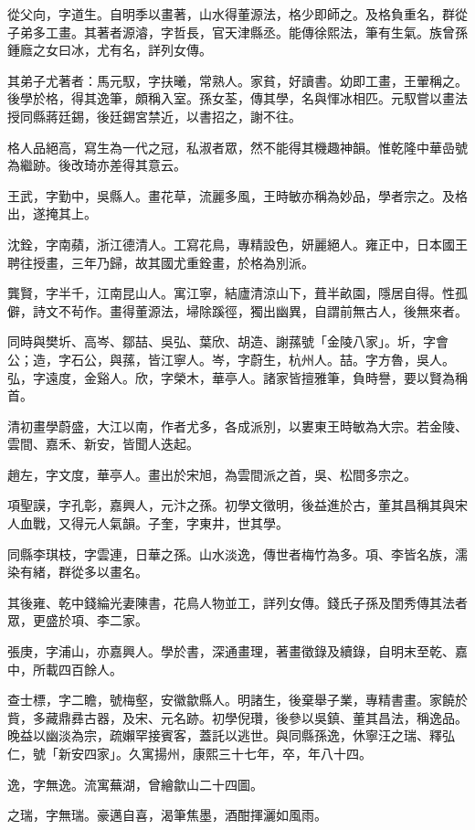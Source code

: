 \begin{pinyinscope}
從父向，字道生。自明季以畫著，山水得董源法，格少即師之。及格負重名，群從子弟多工畫。其著者源濬，字哲長，官天津縣丞。能傳徐熙法，筆有生氣。族曾孫鍾廕之女曰冰，尤有名，詳列女傳。

其弟子尤著者：馬元馭，字扶曦，常熟人。家貧，好讀書。幼即工畫，王翬稱之。後學於格，得其逸筆，頗稱入室。孫女荃，傳其學，名與惲冰相匹。元馭嘗以畫法授同縣蔣廷錫，後廷錫宮禁近，以書招之，謝不往。

格人品絕高，寫生為一代之冠，私淑者眾，然不能得其機趣神韻。惟乾隆中華嵒號為繼跡。後改琦亦差得其意云。

王武，字勤中，吳縣人。畫花草，流麗多風，王時敏亦稱為妙品，學者宗之。及格出，遂掩其上。

沈銓，字南蘋，浙江德清人。工寫花鳥，專精設色，妍麗絕人。雍正中，日本國王聘往授畫，三年乃歸，故其國尤重銓畫，於格為別派。

龔賢，字半千，江南昆山人。寓江寧，結廬清涼山下，葺半畝園，隱居自得。性孤僻，詩文不茍作。畫得董源法，埽除蹊徑，獨出幽異，自謂前無古人，後無來者。

同時與樊圻、高岑、鄒喆、吳弘、葉欣、胡造、謝蓀號「金陵八家」。圻，字會公；造，字石公，與蓀，皆江寧人。岑，字蔚生，杭州人。喆。字方魯，吳人。弘，字遠度，金谿人。欣，字榮木，華亭人。諸家皆擅雅筆，負時譽，要以賢為稱首。

清初畫學蔚盛，大江以南，作者尤多，各成派別，以婁東王時敏為大宗。若金陵、雲間、嘉禾、新安，皆聞人迭起。

趙左，字文度，華亭人。畫出於宋旭，為雲間派之首，吳、松間多宗之。

項聖謨，字孔彰，嘉興人，元汴之孫。初學文徵明，後益進於古，董其昌稱其與宋人血戰，又得元人氣韻。子奎，字東井，世其學。

同縣李琪枝，字雲連，日華之孫。山水淡逸，傳世者梅竹為多。項、李皆名族，濡染有緒，群從多以畫名。

其後雍、乾中錢綸光妻陳書，花鳥人物並工，詳列女傳。錢氏子孫及閨秀傳其法者眾，更盛於項、李二家。

張庚，字浦山，亦嘉興人。學於書，深通畫理，著畫徵錄及續錄，自明末至乾、嘉中，所載四百餘人。

查士標，字二瞻，號梅壑，安徽歙縣人。明諸生，後棄舉子業，專精書畫。家饒於貲，多藏鼎彞古器，及宋、元名跡。初學倪瓚，後參以吳鎮、董其昌法，稱逸品。晚益以幽淡為宗，疏嬾罕接賓客，蓋託以逃世。與同縣孫逸，休寧汪之瑞、釋弘仁，號「新安四家」。久寓揚州，康熙三十七年，卒，年八十四。

逸，字無逸。流寓蕪湖，曾繪歙山二十四圖。

之瑞，字無瑞。豪邁自喜，渴筆焦墨，酒酣揮灑如風雨。


\end{pinyinscope}
